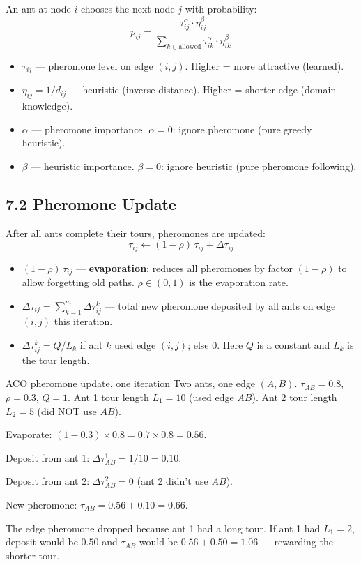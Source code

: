 \documentclass[a4paper,11pt]{article}
\begin{document}
An ant at node $i$ chooses the next node $j$ with probability:
\[
p_{ij} = \frac{\tau_{ij}^\alpha \cdot \eta_{ij}^\beta}{\displaystyle\sum_{k \in \text{allowed}} \tau_{ik}^\alpha \cdot \eta_{ik}^\beta}
\]

\begin{itemize}
  \item $\tau_{ij}$ — pheromone level on edge $(i,j)$. Higher = more attractive (learned).
  \item $\eta_{ij} = 1/d_{ij}$ — heuristic (inverse distance). Higher = shorter edge (domain knowledge).
  \item $\alpha$ — pheromone importance. $\alpha = 0$: ignore pheromone (pure greedy heuristic).
  \item $\beta$ — heuristic importance. $\beta = 0$: ignore heuristic (pure pheromone following).
\end{itemize}

\subsection{7.2 Pheromone Update}

After all ants complete their tours, pheromones are updated:
\[
\tau_{ij} \leftarrow (1 - \rho)\,\tau_{ij} + \Delta\tau_{ij}
\]

\begin{itemize}
  \item $(1-\rho)\,\tau_{ij}$ — \textbf{evaporation}: reduces all pheromones by factor $(1-\rho)$ to allow forgetting old paths. $\rho \in (0,1)$ is the evaporation rate.
  \item $\Delta\tau_{ij} = \sum_{k=1}^{m} \Delta\tau_{ij}^k$ — total new pheromone deposited by all ants on edge $(i,j)$ this iteration.
  \item $\Delta\tau_{ij}^k = Q/L_k$ if ant $k$ used edge $(i,j)$; else 0. Here $Q$ is a constant and $L_k$ is the tour length.
\end{itemize}

\begin{worked}{ACO pheromone update, one iteration}
Two ants, one edge $(A,B)$. $\tau_{AB} = 0.8$, $\rho = 0.3$, $Q = 1$.
Ant 1 tour length $L_1 = 10$ (used edge $AB$). Ant 2 tour length $L_2 = 5$ (did NOT use $AB$).

\begin{steps}
  \item Evaporate: $(1 - 0.3) \times 0.8 = 0.7 \times 0.8 = 0.56$.
  \item Deposit from ant 1: $\Delta\tau^1_{AB} = 1/10 = 0.10$.
  \item Deposit from ant 2: $\Delta\tau^2_{AB} = 0$ (ant 2 didn't use $AB$).
  \item New pheromone: $\tau_{AB} = 0.56 + 0.10 = \mathbf{0.66}$.
\end{steps}
The edge pheromone dropped because ant 1 had a long tour. If ant 1 had $L_1 = 2$, deposit would be $0.50$ and $\tau_{AB}$ would be $0.56 + 0.50 = 1.06$ — rewarding the shorter tour.
\end{worked}
\end{document}
